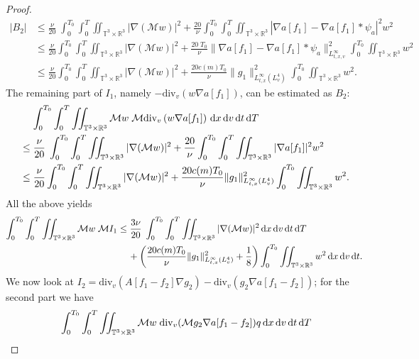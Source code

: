\documentclass[11pt,american, reqno]{amsart}
\numberwithin{equation}{section}
\newcommand{\R}{\mathbb R}
\newcommand{\1}{\mathds{1}}
\newcommand{\dt}{\, {\rm d} t}
\newcommand{\dT}{\, {\rm d} T}
\newcommand{\dv}{\, {\rm d} v}
\newcommand{\dx}{\, {\rm d} x}
\newcommand{\nn}{\nonumber}
\newcommand{\abs}[1]{\left\vert#1\right\vert}
\newcommand{\T}{\mathbb{T}}
\numberwithin{equation}{section}
\begin{document}
\begin{proof}
\begin{align*}
    |B_2| 
& \leq  
\frac{\nu}{20}\; \int_0^{T_0}\int_0^{T} \iint_{\T^3 \times \R^3}  |\nabla(\mathcal{M} w)|^2 %
+  \frac{20}{\nu} \int_0^{T_0}\int_0^{T} \iint_{\T^3 \times \R^3} 
\abs{\nabla a[f_1]-\nabla a[f_1]\ast \psi_a}^2  w^2   %
\\
&\leq  
\frac{\nu}{20} \int_0^{T_0}\int_0^{T} \iint_{\T^3 \times \R^3}  |\nabla(\mathcal{M} w)|^2 %
+  \frac{20 \;T_0 }{\nu} \| \nabla a[f_1]-\nabla a[f_1]\ast \psi_a\|_{L^\infty_{t,x,v}}^2 \int_0^{T_0} \iint_{\T^3 \times \R^3}   w^2   %
\\
& \leq  
\frac{\nu}{20} \int_0^{T_0}\int_0^{T} \iint_{\T^3 \times \R^3}  
|\nabla(\mathcal{M} w)|^2 %
+  \frac{20 c(m) T_0 }{\nu} \| g_1\|_{L^\infty_{t,x}(L^4_v)}^2 \int_0^{T_0} \iint_{\T^3 \times \R^3}   w^2.   %
\end{align*}
The remaining part of $I_1$, namely $-\textrm{div}_v \left( w \nabla a[f_1]\right)$, can be estimated as $B_2$: 
\begin{align*}
& \quad \,
\int_0^{T_0}\int_0^{T} \iint_{\T^3 \times \R^3} \mathcal{M} w \; \mathcal{M}\textrm{div}_v \left( w \nabla a[f_1]\right) \dx\dv\dt\dT 
\\
& \leq  
\frac{\nu}{20}\; \int_0^{T_0}\int_0^{T} \iint_{\T^3 \times \R^3}  |\nabla(\mathcal{M} w)|^2 %
+  \frac{20}{\nu} \int_0^{T_0}\int_0^{T} \iint_{\T^3 \times \R^3}   
|\nabla a[f_1]|^2  w^2   %
\\
& \leq  
\frac{\nu}{20} \int_0^{T_0}\int_0^{T} \iint_{\T^3 \times \R^3}  
|\nabla(\mathcal{M} w)|^2 %
+  \frac{20 c(m) T_0 }{\nu} \| g_1\|_{L^\infty_{t,x}(L^4_v)}^2 \int_0^{T_0} \iint_{\T^3 \times \R^3}   w^2.  %
\end{align*}
All the above yields 
\begin{align*}
    \int_0^{T_0}\int_0^{T} \iint_{\T^3 \times \R^3} \mathcal{M} w \; \mathcal{M}I_1 %
& \leq  
\frac{3 \nu}{20}\; \int_0^{T_0}\int_0^{T} \iint_{\T^3 \times \R^3}  
|\nabla(\mathcal{M} w)|^2 \dx\dv\dt\dT 
\\
& \quad \,
 + \left( \frac{20 c(m) T_0 }{\nu} \| g_1\|_{L^\infty_{t,x}(L^4_v)}^2 + \frac{1}{8}\right) \int_0^{T_0} \iint_{\T^3 \times \R^3}   w^2   \dx\dv\dt. 
\end{align*}
We now look at $I_2 = \textrm{div}_v \left(A[f_1-f_2]\nabla g_2 \right)- \textrm{div}_v (g_2 \nabla a[f_1-f_2])$; for the second part we have 
\begin{align}
& \quad \, 
\int_0^{T_0} \int_0^{T} \iint_{\T^3 \times \R^3}  \mathcal{M} w \;\textrm{div}_v ( \mathcal{M} g_2 \nabla a[f_1-f_2])q \dx\dv\dt\dT \nn

\end{align}
\end{proof}
\end{document}
